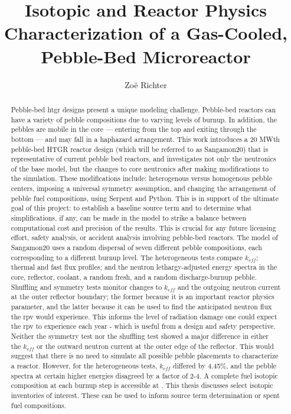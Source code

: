 \documentclass[edeposit,fullpage]{uiucthesis2018}
\title{Isotopic and Reactor Physics Characterization of a Gas-Cooled, Pebble-Bed Microreactor}
\author{Zo{\"e} Richter}
\begin{document}
\maketitle

\frontmatter
\begin{abstract}
Pebble-bed \acrfull{htgr} designs present a unique modeling challenge.  Pebble-bed reactors can have a variety of pebble compositions due to varying levels of burnup.  In addition, the pebbles are mobile in the core --- entering from the top and exiting through the bottom --- and may fall in a haphazard arrangement.  This work introduces a 20 MWth pebble-bed HTGR reactor design (which will be referred to as Sangamon20) that is representative of current pebble bed reactors, and investigates not only the neutronics of the base model, but the changes to core neutronics after making modifications to the simulation.  These modifications include: heterogenous versus homogenous pebble centers, imposing a universal symmetry assumption, and changing the arrangement of pebble fuel compositions, using Serpent and Python.  This is in support of the ultimate goal of this project: to establish a baseline source term and to determine what simplifications, if any, can be made in the model to strike a balance between computational cost and precision of the results.  This is crucial for any future licensing effort, safety analysis, or accident analysis involving pebble-bed reactors.  The model of Sangamon20 uses a random dispersal of seven different pebble compositions, each corresponding to a different burnup level.  The heterogeneous tests compare $k_{eff}$; thermal and fast flux profiles; and the neutron lethargy-adjusted energy spectra in the core, reflector, coolant, a random fresh, and a random discharge-burnup pebble.  Shuffling and symmetry tests monitor changes to $k_{eff}$ and the outgoing neutron current at the outer reflector boundary; the former because it is an important reactor physics parameter, and the latter because it can be used to find the anticipated neutron flux the \acrfull{rpv} would experience.  This informs the level of radiation damage one could expect the \acrshort{rpv} to experience each year - which is useful from a design and safety perspective.  Neither the symmetry test nor the shuffling test showed a major difference in either the $k_{eff}$ or the outward neutron current at the outer edge of the reflector.  This would suggest that there is no need to simulate all possible pebble placements to characterize a reactor.  However, for the heterogeneous tests, $k_{eff}$ differed by 4.45\%, and the pebble spectra at certain higher energies disagreed by a factor of 2-4.  A complete fuel isotopic composition at each burnup step is accessible at \cite{richter_isotopic_2021}. This thesis discusses select isotopic inventories of interest.  These can be used to inform source term determination or spent fuel compositions.

\end{abstract}
\end{document}
